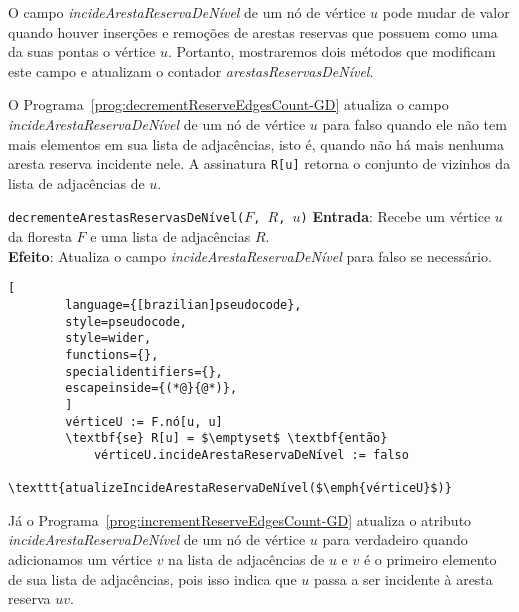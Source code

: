O campo \textit{incideArestaReservaDeNível} de um nó de vértice $u$ pode mudar de valor quando houver inserções e remoções de arestas reservas que possuem como uma da suas pontas o vértice $u$. Portanto, mostraremos dois métodos que modificam este campo e atualizam o contador \textit{arestasReservasDeNível}.

O Programa~\ref{prog:decrementReserveEdgesCount-GD} atualiza o campo \textit{incideArestaReservaDeNível} de um nó de vértice $u$ para falso quando ele não tem mais elementos em sua lista de adjacências, isto é, quando não há mais nenhuma aresta reserva incidente nele. A assinatura \texttt{R[u]} retorna o conjunto de vizinhos da lista de adjacências de $u$.

\begin{programruledcaption}{\texttt{decrementeArestasReservasDeNível($F$, $R$, $u$)} \label{prog:decrementReserveEdgesCount-GD}}
    \noindent\textbf{Entrada}: Recebe um vértice $u$ da floresta $F$ e uma lista de adjacências $R$.\\
    \noindent\textbf{Efeito}: Atualiza o campo \textit{incideArestaReservaDeNível} para falso se necessário.
    \vspace{-0.5\baselineskip}
    \begin{lstlisting}[
        language={[brazilian]pseudocode},
        style=pseudocode,
        style=wider,
        functions={},
        specialidentifiers={},
        escapeinside={(*@}{@*)},
        ]
        vérticeU := F.nó[u, u]
        \textbf{se} R[u] = $\emptyset$ \textbf{então} 
            vérticeU.incideArestaReservaDeNível := falso
            \texttt{atualizeIncideArestaReservaDeNível($\emph{vérticeU}$)}
    \end{lstlisting}
    \vspace{-0.5\baselineskip}
\end{programruledcaption}

Já o Programa~\ref{prog:incrementReserveEdgesCount-GD} atualiza o atributo \textit{incideArestaReservaDeNível} de um nó de vértice $u$ para verdadeiro quando adicionamos um vértice $v$ na lista de adjacências de $u$ e $v$ é o primeiro elemento de sua lista de adjacências, pois isso indica que $u$ passa a ser incidente à aresta reserva $uv$.

